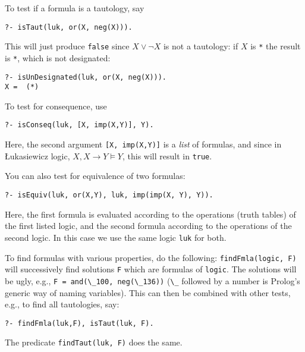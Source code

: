 \documentclass[
]{article}
\newcommand{\passthrough}[1]{#1}
\begin{document}
To test if a formula is a tautology, say

\begin{lstlisting}
?- isTaut(luk, or(X, neg(X))).
\end{lstlisting}

This will just produce \passthrough{\lstinline!false!} since
\(X \lor \lnot X\) is not a tautology: if \(X\) is
\passthrough{\lstinline!*!} the result is \passthrough{\lstinline!*!},
which is not designated:

\begin{lstlisting}
?- isUnDesignated(luk, or(X, neg(X))).
X =  (*) 
\end{lstlisting}

To test for consequence, use

\begin{lstlisting}
?- isConseq(luk, [X, imp(X,Y)], Y).
\end{lstlisting}

Here, the second argument \passthrough{\lstinline![X, imp(X,Y)]!} is a
\emph{list} of formulas, and since in Łukasiewicz logic,
\(X, X \to Y \models Y\), this will result in
\passthrough{\lstinline!true!}.

You can also test for equivalence of two formulas:

\begin{lstlisting}
?- isEquiv(luk, or(X,Y), luk, imp(imp(X, Y), Y)).
\end{lstlisting}

Here, the first formula is evaluated according to the operations (truth
tables) of the first listed logic, and the second formula according to
the operations of the second logic. In this case we use the same logic
\passthrough{\lstinline!luk!} for both.

To find formulas with various properties, do the following:
\passthrough{\lstinline!findFmla(logic, F)!} will successively find
solutions \passthrough{\lstinline!F!} which are formulas of
\passthrough{\lstinline!logic!}. The solutions will be ugly, e.g.,
\passthrough{\lstinline!F = and(\_100, neg(\_136))!}
(\passthrough{\lstinline!\_!} followed by a number is Prolog's generic
way of naming variables). This can then be combined with other tests,
e.g., to find all tautologies, say:

\begin{lstlisting}
?- findFmla(luk,F), isTaut(luk, F).
\end{lstlisting}

The predicate \passthrough{\lstinline!findTaut(luk, F)!} does the same.
\end{document}
